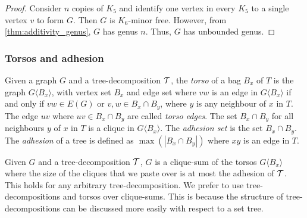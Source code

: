 \begin{proof}
	Consider $n$ copies of $K_5$ and identify one vertex in every $K_5$ to a single vertex $v$ to form $G$. Then $G$ is $K_6$-minor free. However, from \cref{thm:additivity_genus}, $G$ has genus $n$. Thus, $G$ has unbounded genus. 
\end{proof}

\subsubsection{Torsos and adhesion}\label{sssec:Torsos and Adhesion}
Given a graph \(G\) and a tree-decomposition \(\mathcal{T}\), the \textit{torso} of a bag \(B_x\) of \(T\) is the graph \(G\langle B_x \rangle\), with vertex set $B_x$ and edge set where \(vw\) is an edge in \(G\langle B_x \rangle\) if and only if $vw \in E(G)$ or \(v,w \in B_x \cap B_y\), where \(y\) is any neighbour of \(x\) in \(T\). The edge $uv$ where $uv \in B_x \cap B_y$ are called \textit{torso edges}. The set \(B_x \cap B_y\) for all neighbours \(y\) of \(x\) in \(T\) is a clique in \(G\langle B_x \rangle\).
The \textit{adhesion set} is the set \(B_x \cap B_y\). 
The \textit{adhesion} of a tree is defined as \(\max(|B_x \cap B_y|)\) where \(xy\) is an edge in \(T\).

Given \(G\) and a tree-decomposition \(\mathcal{T}\), \(G\) is a clique-sum of the torsos \(G\langle B_x \rangle\) where the size of the cliques that we paste over is at most the adhesion of $\mathcal{T}$. This holds for any arbitrary tree-decomposition.
We prefer to use tree-decompositions and torsos over clique-sums. This is because the structure of tree-decompositions can be discussed more easily with respect to a set tree.

